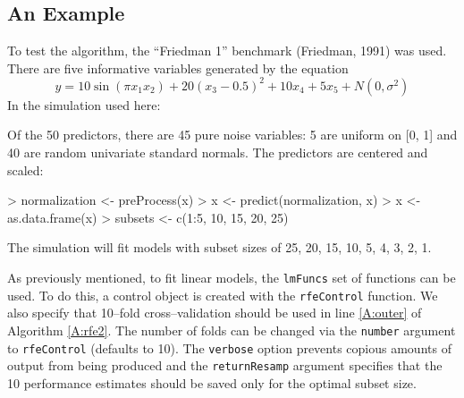 \documentclass[12pt]{article}
\begin{document}
\subsection{An Example}


To test the algorithm, the ``Friedman 1'' benchmark (Friedman, 1991) was used. There are five informative variables generated by the equation
\[
y = 10 \sin(\pi x_1x_2) + 20 (x_3 - 0.5)^2 + 10 x_4 + 5 x_5 + N(0, \sigma^2)
\]
In the simulation used here:
\begin{Schunk}
\end{Schunk}
Of the 50 predictors, there are 45 pure noise variables: 5 are uniform on [0, 1] and 40 are random univariate standard normals. The predictors are centered and scaled:
\begin{Schunk}
\begin{Sinput}
> normalization <- preProcess(x)
> x <- predict(normalization, x)
> x <- as.data.frame(x)
> subsets <- c(1:5, 10, 15, 20, 25)
\end{Sinput}
\end{Schunk}
The simulation will fit models with subset sizes of 25, 20, 15, 10, 5, 4, 3, 2, 1. 


As previously mentioned, to fit linear models, the \texttt{lmFuncs} set of functions can be used. To do this, a control object is created with the \texttt{rfeControl} function. We also specify that 10--fold cross--validation should be used in line \ref{A:outer} of Algorithm  \ref{A:rfe2}. The number of folds can be changed via the \texttt{number} argument to \texttt{rfeControl} (defaults to 10). The \texttt{verbose} option prevents copious amounts of output from being produced and the \texttt{returnResamp} argument specifies that the 10 performance estimates should be saved only for the optimal subset size.
\end{document}
